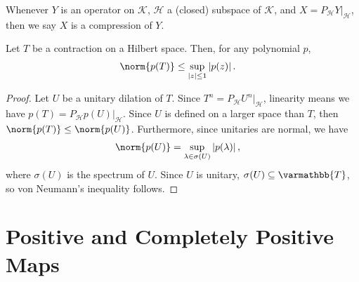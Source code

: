 \documentclass[10pt]{mypackage}
\renewcommand*{\mathbb}[1]{\varmathbb{#1}}
\begin{document}
Whenever $Y$ is an operator on $\mathcal{K}$, $\mathcal{H}$ a (closed) subspace of $\mathcal{K}$, and $X = P_{\mathcal{H}}Y|_{\mathcal{H}}$, then we say $X$ is a compression of $Y$.
\begin{corollary}
Let $T$ be a contraction on a Hilbert space. Then, for any polynomial $p$,
\begin{align*}
  \norm{p(T)} &\leq \sup_{|z| \leq 1}\left\vert p(z) \right\vert.
\end{align*}
\end{corollary}
\begin{proof}
  Let $U$ be a unitary dilation of $T$. Since $T^n = P_{\mathcal{H}}U^n|_{\mathcal{H}}$, linearity means we have $p(T) = P_{\mathcal{H}}p(U)|_{\mathcal{H}}$. Since $U$ is defined on a larger space than $T$, then $\norm{p(T)}\leq \norm{p(U)}$. Furthermore, since unitaries are normal, we have
  \begin{align*}
    \norm{p(U)} &= \sup_{\lambda\in\sigma(U)} \left\vert p(\lambda) \right\vert,
  \end{align*}
  where $\sigma(U)$ is the spectrum of $U$. Since $U$ is unitary, $\sigma(U)\subseteq \mathbb{T}$, so von Neumann's inequality follows.
\end{proof}
\section{Positive and Completely Positive Maps}%
\end{document}
